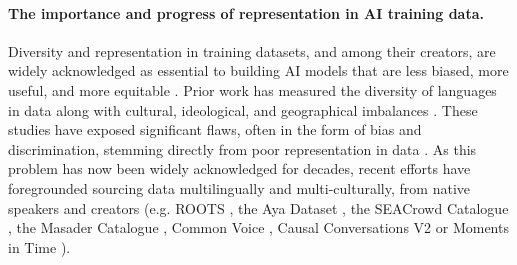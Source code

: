\vspace{-2mm}
\paragraph{The importance and progress of representation in AI training data.}
Diversity and representation in training datasets, and among their creators, are widely acknowledged as essential to building AI models that are less biased, more useful, and more equitable \citep{joshi2020state,singh2024aya,ustun2024aya,adelani2021masakhaner,adelani2024irokobenchnewbenchmarkafrican,aakanksha2024multilingualalignmentprismaligning, mcmillanmajor2022documentinggeographicallycontextuallydiverse, porgali2023casualconversationsv2dataset, monfort2019moments, sigurdsson2016hollywoodhomescrowdsourcingdata}.
Prior work has measured the diversity of languages in data along with cultural, ideological, and geographical imbalances \citep{faisal2022dataset,shankar2017no,mcmillan2022documenting,de2019does,mahadev2021understanding}.
These studies have exposed significant flaws, often in the form of bias and discrimination, stemming directly from poor representation in data \citep{buolamwiniGenderShades2018, birhane2021multimodal}.
As this problem has now been widely acknowledged for decades, recent efforts have foregrounded sourcing data multilingually and multi-culturally, from native speakers and creators (e.g. ROOTS \citep{NEURIPS2022_ce9e92e3}, the Aya Dataset \citep{singh2024aya}, the SEACrowd Catalogue \citep{lovenia2024seacrowd}, the Masader Catalogue \citep{alyafeai2022masader}, Common Voice \citep{ardila2019common}, Causal Conversations V2 \citep{porgali2023casualconversationsv2dataset} or Moments in Time \citep{monfort2019moments}).

\vspace{-2mm}
